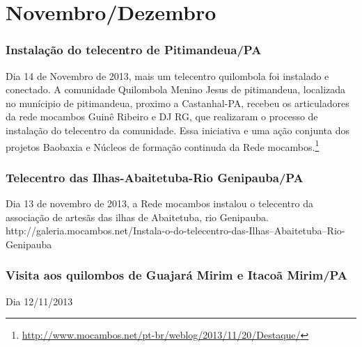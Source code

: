 \documentclass[a4paper, 11pt, oneside]{Relatorio_sem}  %
\begin{document}



\part{Novembro/Dezembro}

\section{Instalação do telecentro de Pitimandeua/PA}

Dia 14 de Novembro de 2013, mais um telecentro quilombola foi
instalado e conectado.  A comunidade Quilombola Menino Jesus de
pitimandeua, localizada no munícipio de pitimandeua, proximo a
Castanhal-PA, recebeu os articuladores da rede mocambos Guinê Ribeiro
e DJ RG, que realizaram o processo de instalação do telecentro da
comunidade.  Essa iniciativa e uma ação conjunta dos projetos Baobaxia
e Núcleos de formação continuda da Rede
mocambos.\footnote{\url{http://www.mocambos.net/pt-br/weblog/2013/11/20/Destaque/}}


\section{Telecentro das Ilhas-Abaitetuba-Rio Genipauba/PA}

Dia 13 de novembro de 2013, a Rede mocambos instalou o telecentro da
associação de artesãs das ilhas de Abaitetuba, rio Genipauba.
http://galeria.mocambos.net/Instala-o-do-telecentro-das-Ilhas--Abaitetuba--Rio-Genipauba


\section{Visita aos quilombos de Guajará Mirim e Itacoã Mirim/PA}
Dia 12/11/2013 
\end{document}
